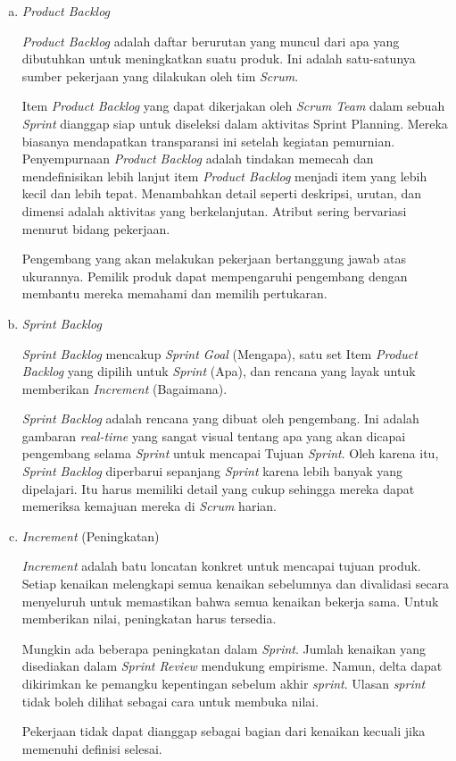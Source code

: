 	\begin{enumerate}[a.]
	
		\item \emph{Product Backlog}
		
		\emph{Product Backlog} adalah daftar berurutan yang muncul dari apa yang dibutuhkan untuk meningkatkan suatu produk. Ini adalah satu-satunya sumber pekerjaan yang dilakukan oleh tim \emph{Scrum}.

		Item \emph{Product Backlog} yang dapat dikerjakan oleh \emph{Scrum Team} dalam sebuah \emph{Sprint} dianggap siap untuk diseleksi dalam aktivitas Sprint Planning. Mereka biasanya mendapatkan transparansi ini setelah kegiatan pemurnian. Penyempurnaan \emph{Product Backlog} adalah tindakan memecah dan mendefinisikan lebih lanjut item \emph{Product Backlog} menjadi item yang lebih kecil dan lebih tepat. Menambahkan detail seperti deskripsi, urutan, dan dimensi adalah aktivitas yang berkelanjutan. Atribut sering bervariasi menurut bidang pekerjaan.

		Pengembang yang akan melakukan pekerjaan bertanggung jawab atas ukurannya. Pemilik produk dapat mempengaruhi pengembang dengan membantu mereka memahami dan memilih pertukaran.
		
		\item \emph{Sprint Backlog}
		
		\emph{Sprint Backlog} mencakup \emph{Sprint Goal} (Mengapa), satu set Item \emph{Product Backlog} yang dipilih untuk \emph{Sprint} (Apa), dan rencana yang layak untuk memberikan \emph{Increment} (Bagaimana).

		\emph{Sprint Backlog} adalah rencana yang dibuat oleh pengembang. Ini adalah gambaran \emph{real-time} yang sangat visual tentang apa yang akan dicapai pengembang selama \emph{Sprint} untuk mencapai Tujuan \emph{Sprint}. Oleh karena itu, \emph{Sprint Backlog} diperbarui sepanjang \emph{Sprint} karena lebih banyak yang dipelajari. Itu harus memiliki detail yang cukup sehingga mereka dapat memeriksa kemajuan mereka di \emph{Scrum} harian.
		
		\item \emph{Increment} (Peningkatan)
		
		\emph{Increment} adalah batu loncatan konkret untuk mencapai tujuan produk. Setiap kenaikan melengkapi semua kenaikan sebelumnya dan divalidasi secara menyeluruh untuk memastikan bahwa semua kenaikan bekerja sama. Untuk memberikan nilai, peningkatan harus tersedia.

		Mungkin ada beberapa peningkatan dalam \emph{Sprint}. Jumlah kenaikan yang disediakan dalam \emph{Sprint Review} mendukung empirisme. Namun, delta dapat dikirimkan ke pemangku kepentingan sebelum akhir \emph{sprint}. Ulasan \emph{sprint} tidak boleh dilihat sebagai cara untuk membuka nilai.

		Pekerjaan tidak dapat dianggap sebagai bagian dari kenaikan kecuali jika memenuhi definisi selesai.	
	\end{enumerate}

